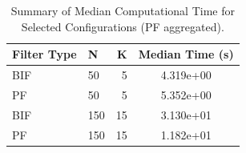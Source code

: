 \begin{table}
\caption{Summary of Median Computational Time for Selected Configurations (PF aggregated).}
\label{tab:comp_perf_summary_median}
\begin{tabular}{llrc}
\toprule
Filter Type & N & K & Median Time (s) \\
\midrule
BIF & 50 & 5 & 4.319e+00 \\
PF & 50 & 5 & 5.352e+00 \\
BIF & 150 & 15 & 3.130e+01 \\
PF & 150 & 15 & 1.182e+01 \\
\bottomrule
\end{tabular}
\end{table}
